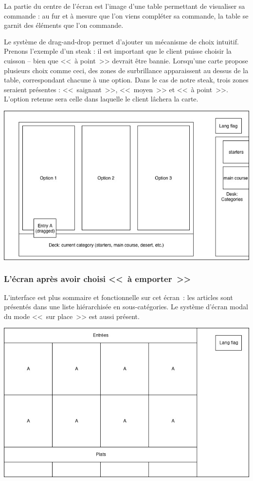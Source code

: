 \documentclass[a4paper,12pt]{article}
\begin{document}
La partie du centre de l'écran est l'image d'une table permettant de visualiser sa commande : au fur et à mesure que
l'on viens compléter sa commande, la table se garnit des éléments que l'on commande.

Le système de drag-and-drop permet d'ajouter un mécanisme de choix intuitif. Prenons l'exemple d'un steak : il est
important que le client puisse choisir la cuisson -- bien que <<~à point~>> devrait être bannie. Lorsqu'une carte
propose plusieurs choix comme ceci, des zones de surbrillance apparaissent au dessus de la table, correspondant
chacune à une option. Dans le cas de notre steak, trois zones seraient présentes : <<~saignant~>>, <<~moyen~>> et
<<~à point~>>. L'option retenue sera celle dans laquelle le client lâchera la carte.

\begin{center}
	\includegraphics[width=\textwidth]{in_place_drag_options.jpg}
\end{center}

\subsubsection{L'écran après avoir choisi <<~à emporter~>>}

L'interface est plus sommaire et fonctionnelle sur cet écran~: les articles sont présentés dans une liste hiérarchisée
en sous-catégories. Le système d'écran modal du mode <<~sur place~>> est aussi présent.

\begin{center}
	\includegraphics[width=\textwidth]{takeaway_screen.jpg}
\end{center}
\end{document}
